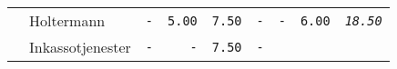 \documentclass[11pt,A4paper,]{article}
\begin{document}
\begin{longtable}[]{@{}llrrrrrrr@{}}
\begin{minipage}[t]{0.11\columnwidth}\raggedright\strut
\strut
\end{minipage} & \begin{minipage}[t]{0.11\columnwidth}\raggedright\strut
Holtermann\strut
\end{minipage} & \begin{minipage}[t]{0.11\columnwidth}\raggedleft\strut
\texttt{-}\strut
\end{minipage} & \begin{minipage}[t]{0.11\columnwidth}\raggedleft\strut
\texttt{5.00}\strut
\end{minipage} & \begin{minipage}[t]{0.11\columnwidth}\raggedleft\strut
\texttt{7.50}\strut
\end{minipage} & \begin{minipage}[t]{0.11\columnwidth}\raggedleft\strut
\texttt{-}\strut
\end{minipage} & \begin{minipage}[t]{0.11\columnwidth}\raggedleft\strut
\texttt{-}\strut
\end{minipage} & \begin{minipage}[t]{0.11\columnwidth}\raggedleft\strut
\texttt{6.00}\strut
\end{minipage} & \begin{minipage}[t]{0.11\columnwidth}\raggedleft\strut
\emph{\texttt{18.50}}\strut
\end{minipage}\tabularnewline
\begin{minipage}[t]{0.11\columnwidth}\raggedright\strut
\strut
\end{minipage} & \begin{minipage}[t]{0.11\columnwidth}\raggedright\strut
Inkassotjenester\strut
\end{minipage} & \begin{minipage}[t]{0.11\columnwidth}\raggedleft\strut
\texttt{-}\strut
\end{minipage} & \begin{minipage}[t]{0.11\columnwidth}\raggedleft\strut
\texttt{-}\strut
\end{minipage} & \begin{minipage}[t]{0.11\columnwidth}\raggedleft\strut
\texttt{7.50}\strut
\end{minipage} & \begin{minipage}[t]{0.11\columnwidth}\raggedleft\strut
\texttt{-}\strut
\end{minipage} & \begin{minipage}[t]{0.11\columnwidth}\raggedleft\strut

\end{minipage}
\end{longtable}
\end{document}
